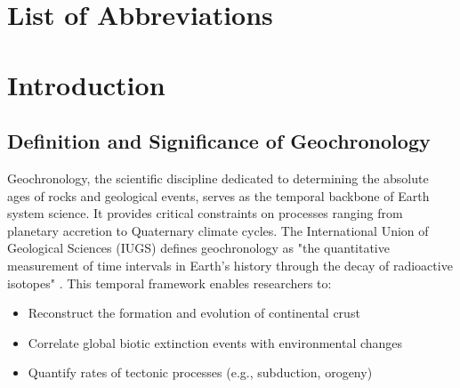\documentclass{article}
\begin{document}
\section{List of Abbreviations}
\begin{acronym}[AMOC] %
\end{acronym}
\newpage

\section{Introduction}
\subsection{Definition and Significance of Geochronology}
\label{subsec:definition}

Geochronology, the scientific discipline dedicated to determining the absolute ages of rocks and geological events, serves as the temporal backbone of Earth system science. It provides critical constraints on processes ranging from planetary accretion to Quaternary climate cycles. The International Union of Geological Sciences (IUGS) defines geochronology as "the quantitative measurement of time intervals in Earth's history through the decay of radioactive isotopes" \cite{Dickin2005}. This temporal framework enables researchers to:

\begin{itemize}
    \item Reconstruct the formation and evolution of continental crust
    \item Correlate global biotic extinction events with environmental changes
    \item Quantify rates of tectonic processes (e.g., subduction, orogeny)
\end{itemize}
\end{document}
